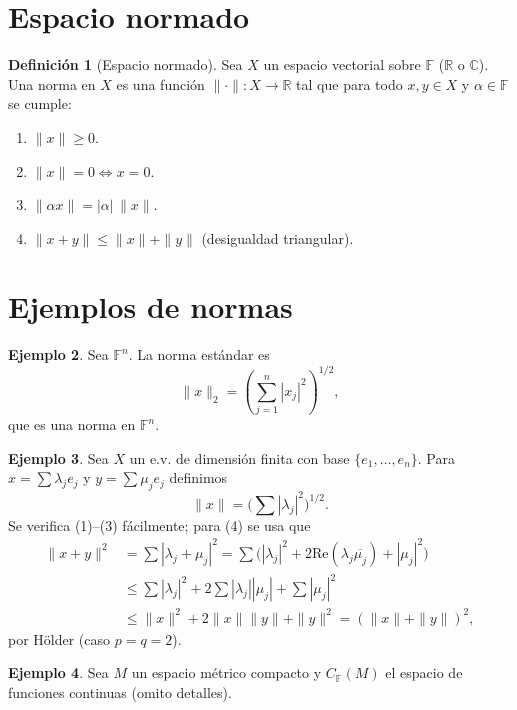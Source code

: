 \documentclass[11pt]{article}
\theoremstyle{definition}
\newtheorem{definition}{Definición}[section]
\newtheorem{example}[definition]{Ejemplo}
\theoremstyle{plain}
\begin{document}

\section*{Espacio normado}

\begin{definition}[Espacio normado]
Sea $X$ un espacio vectorial sobre $\mathbb{F}$ (\(\mathbb{R}\) o \(\mathbb{C}\)). Una norma en $X$ es una función $\|\cdot\|:X\to\mathbb{R}$ tal que para todo $x,y\in X$ y $\alpha\in\mathbb{F}$ se cumple:
\begin{enumerate}[label=(\arabic*)]
\item $\|x\|\ge 0$.
\item $\|x\|=0\iff x=0$.
\item $\|\alpha x\|=|\alpha|\,\|x\|$.
\item $\|x+y\|\le\|x\|+\|y\|$ (desigualdad triangular).
\end{enumerate}
\end{definition}

\section*{Ejemplos de normas}

\begin{example}
Sea $\mathbb{F}^n$. La norma estándar es
$$\|x\|_2=(\sum_{j=1}^n|x_j|^2)^{1/2},$$
que es una norma en $\mathbb{F}^n$.
\end{example}

\begin{example}
Sea $X$ un e.v. de dimensión finita con base $\{e_1,\dots,e_n\}$. Para
$x=\sum\lambda_j e_j$ y $y=\sum\mu_j e_j$ definimos
$$\|x\|=\Big(\sum|\lambda_j|^2\Big)^{1/2}.$$
Se verifica (1)--(3) fácilmente; para (4) se usa que
\begin{align*}
\|x+y\|^2&=\sum|\lambda_j+\mu_j|^2=\sum\big(|\lambda_j|^2+2\mathrm{Re}(\lambda_j\overline{\mu_j})+|\mu_j|^2\big)\\
&\le\sum|\lambda_j|^2+2\sum|\lambda_j||\mu_j|+\sum|\mu_j|^2\\
&\le\|x\|^2+2\|x\|\|y\|+\|y\|^2=(\|x\|+\|y\|)^2,
\end{align*}
por Hölder (caso $p=q=2$).
\end{example}

\begin{example}
Sea $M$ un espacio métrico compacto y $C_{\mathbb{F}}(M)$ el espacio de funciones continuas (omito detalles).
\end{example}
\end{document}
